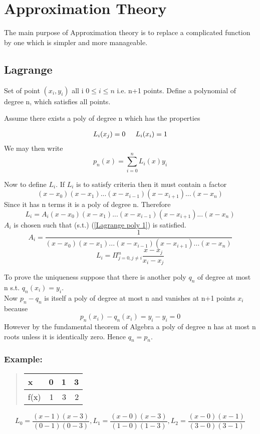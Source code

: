 \chapter{Approximation Theory}
The main purpose of Approximation theory is to replace a complicated function by one which is simpler and more
manageable.
\section{Lagrange}
Set of point $(x_i,y_i)$ all i $0\leq i \leq n $ i.e. n+1 points.
Define a polynomial of degree n, which satisfies all points.

Assume there exists a poly of degree n which has the properties

\begin{eqnarray}
L_{i}(x_j) = 0 \hspace{0.2 in}
L_{i}(x_i) = 1 
\label{Lagrange poly 1}
\end{eqnarray}
We may then write
\[p_n(x) = \sum_{i=0}^{n} L_{i}(x)y_{i} \]

Now to define $L_{i}$.  If $L_i$ is to satisfy criteria then it must contain a factor
\[ (x-x_0)(x-x_1)...(x-x_{i-1})(x-x_{i+1})...(x-x_n) \]
Since it has n terms it is a poly of degree n.  Therefore
\[ L_i = A_i(x-x_0)(x-x_1)...(x-x_{i-1})(x-x_{i+1})...(x-x_n) \]
$A_i $ is chosen such that (s.t.) (\ref{Lagrange poly 1}) is satisfied.
\[A_{i} = \frac{1}{(x-x_0)(x-x_1)...(x-x_{i-1})(x-x_{i+1})...(x-x_n)} \]
\[L_{i} = \Pi_{j=0,j \neq i}^{n} \frac{x-x_j}{x_i-x_j} \]

To prove the uniqueness suppose that there is another poly $q_n$ of degree at most n s.t. $q_{n}(x_{i}) = y_i$.\\
Now $p_n - q_n$ is itself a poly of degree at most n and vanishes at n+1 points $x_i$ because
\[ p_n(x_i) - q_n(x_i) = y_i - y_i =0 \]
However by the fundamental theorem of Algebra a poly of degree n has at most n roots unless it is identically zero. Hence $q_n = p_n$.
\subsection*{Example:}
\begin{quote}
\begin{tabular}{lrrr}
x & 0 & 1 & 3 \\ \hline
f(x) & 1 & 3 & 2 
\end{tabular}
\end{quote}
\[ L_0 = \frac{(x-1)(x-3)}{(0-1)(0-3)},
 L_1 = \frac{(x-0)(x-3)}{(1-0)(1-3)},
 L_2 = \frac{(x-0)(x-1)}{(3-0)(3-1)} \]

